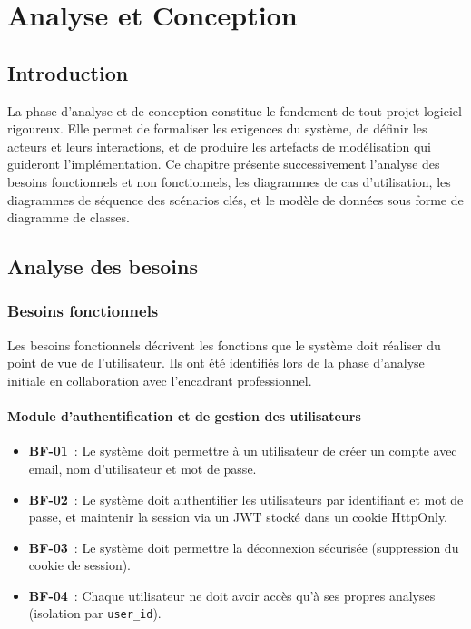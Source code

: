 
\chapter{Analyse et Conception}

\section{Introduction}

La phase d'analyse et de conception constitue le fondement de tout projet logiciel rigoureux. Elle permet de formaliser les exigences du système, de définir les acteurs et leurs interactions, et de produire les artefacts de modélisation qui guideront l'implémentation. Ce chapitre présente successivement l'analyse des besoins fonctionnels et non fonctionnels, les diagrammes de cas d'utilisation, les diagrammes de séquence des scénarios clés, et le modèle de données sous forme de diagramme de classes.

\section{Analyse des besoins}

\subsection{Besoins fonctionnels}

Les besoins fonctionnels décrivent les fonctions que le système doit réaliser du point de vue de l'utilisateur. Ils ont été identifiés lors de la phase d'analyse initiale en collaboration avec l'encadrant professionnel.

\subsubsection{Module d'authentification et de gestion des utilisateurs}
\begin{itemize}
  \item \textbf{BF-01}~: Le système doit permettre à un utilisateur de créer un compte avec email, nom d'utilisateur et mot de passe.
  \item \textbf{BF-02}~: Le système doit authentifier les utilisateurs par identifiant et mot de passe, et maintenir la session via un JWT stocké dans un cookie HttpOnly.
  \item \textbf{BF-03}~: Le système doit permettre la déconnexion sécurisée (suppression du cookie de session).
  \item \textbf{BF-04}~: Chaque utilisateur ne doit avoir accès qu'à ses propres analyses (isolation par \texttt{user\_id}).
\end{itemize}


